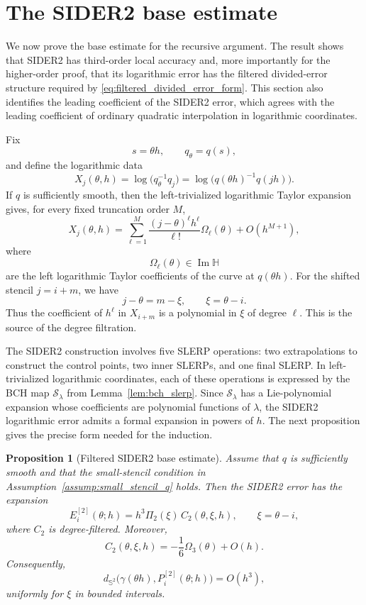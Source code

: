 \documentclass[a4paper,11pt]{article}
\newcommand{\bS}{\mathbb{S}}
\newcommand{\bH}{\mathbb{H}}
\newcommand{\ImH}{\operatorname{Im}\bH}
\numberwithin{equation}{section}
\theoremstyle{plain}
\newtheorem{prop}[thm]{Proposition}
\theoremstyle{definition}
\theoremstyle{remark}
\begin{document}
\section{The SIDER2 base estimate}
\label{sec:sider2_base_filtered}

We now prove the base estimate for the recursive argument.  The result shows
that SIDER2 has third-order local accuracy and, more importantly for the
higher-order proof, that its logarithmic error has the filtered divided-error
structure required by \eqref{eq:filtered_divided_error_form}.  This section
also identifies the leading coefficient of the SIDER2 error, which agrees with
the leading coefficient of ordinary quadratic interpolation in logarithmic
coordinates.

Fix
\[
        s=\theta h,
        \qquad
        q_\theta=q(s),
\]
and define the logarithmic data
\[
        X_j(\theta,h)
        =
        \log\bigl(q_\theta^{-1}q_j\bigr)
        =
        \log\bigl(q(\theta h)^{-1}q(jh)\bigr).
\]
If \(q\) is sufficiently smooth, then the left-trivialized logarithmic Taylor
expansion gives, for every fixed truncation order \(M\),
\begin{equation}
\label{eq:log_data_taylor}
        X_j(\theta,h)
        =
        \sum_{\ell=1}^{M}
        \frac{(j-\theta)^\ell h^\ell}{\ell!}\Omega_\ell(\theta)
        +O(h^{M+1}),
\end{equation}
where
\[
        \Omega_\ell(\theta)\in\ImH
\]
are the left logarithmic Taylor coefficients of the curve at \(q(\theta h)\).
For the shifted stencil \(j=i+m\), we have
\[
        j-\theta=m-\xi,
        \qquad
        \xi=\theta-i.
\]
Thus the coefficient of \(h^\ell\) in \(X_{i+m}\) is a polynomial in
\(\xi\) of degree \(\ell\).  This is the source of the degree filtration.

The SIDER2 construction involves five SLERP operations: two extrapolations to
construct the control points, two inner SLERPs, and one final SLERP.  In
left-trivialized logarithmic coordinates, each of these operations is expressed
by the BCH map \(\mathcal S_\lambda\) from Lemma~\ref{lem:bch_slerp}.  Since
\(\mathcal S_\lambda\) has a Lie-polynomial expansion whose coefficients are
polynomial functions of \(\lambda\), the SIDER2 logarithmic error admits a
formal expansion in powers of \(h\).  The next proposition gives the precise
form needed for the induction.

\begin{prop}[Filtered SIDER2 base estimate]
\label{prop:q_sider2_base}
Assume that \(q\) is sufficiently smooth and that the small-stencil condition
in Assumption~\ref{assump:small_stencil_q} holds.  Then the SIDER2 error has
the expansion
\begin{equation}
\label{eq:q_sider2_error}
        E_i^{[2]}(\theta;h)
        =
        h^3\Pi_2(\xi)\,C_2(\theta,\xi,h),
        \qquad \xi=\theta-i,
\end{equation}
where \(C_2\) is degree-filtered.  Moreover,
\[
        C_2(\theta,\xi,h)
        =
        -\frac16\Omega_3(\theta)+O(h).
\]
Consequently,
\[
        d_{\bS^2}\bigl(\gamma(\theta h),P_i^{[2]}(\theta;h)\bigr)
        =
        O(h^3),
\]
uniformly for \(\xi\) in bounded intervals.
\end{prop}
\end{document}
